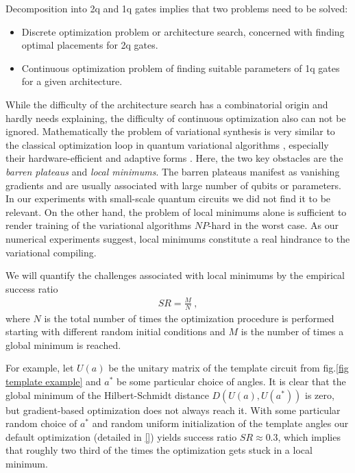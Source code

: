 \documentclass[amsfonts, amssymb, aps, nofootinbib, twocolumn]{revtex4-2}
\begin{document}
Decomposition into 2q and 1q gates implies that two problems need to be solved:
\begin{itemize}
	\item Discrete optimization problem or architecture search, concerned with finding optimal placements for 2q gates.
	\item Continuous optimization problem of finding suitable parameters of 1q gates for a given architecture.
\end{itemize}
While the difficulty of the architecture search has a combinatorial origin and hardly needs explaining, the difficulty of continuous optimization also can not be ignored. Mathematically the problem of variational synthesis is very similar to the classical optimization loop in quantum variational algorithms \cite{}, especially their hardware-efficient \cite{Kandala2017} and adaptive \cite{} forms . Here, the two key obstacles are the \textit{barren plateaus} and \textit{local minimums}. The barren plateaus manifest as vanishing gradients and are usually associated with large number of qubits or parameters. In our experiments with small-scale quantum circuits we did not find it to be relevant. On the other hand, the problem of local minimums alone is sufficient to render training of the variational algorithms $NP$-hard \cite{Bittel2021} in the worst case. As our numerical experiments suggest, local minimums constitute a real hindrance to the variational compiling.

We will quantify the challenges associated with local minimums by the empirical success ratio
\begin{align}
	SR=\frac{M}{N} \ ,
\end{align}
where $N$ is the total number of times the optimization procedure is performed starting with different random initial conditions and $M$ is the number of times a global minimum is reached. 

For example, let $U(a)$ be the unitary matrix of the template circuit from fig.\ref{fig template example} and $a^*$ be some particular choice of angles. It is clear that the global minimum of the Hilbert-Schmidt distance $D(U(a), U(a^*))$ is zero, but gradient-based optimization does not always reach it. With some particular random choice of $a^*$ and random uniform initialization of the template angles our default optimization (detailed in \ref{}) yields success ratio $SR\approx0.3$, which implies that roughly two third of the times the optimization gets stuck in a local minimum. 
\end{document}
